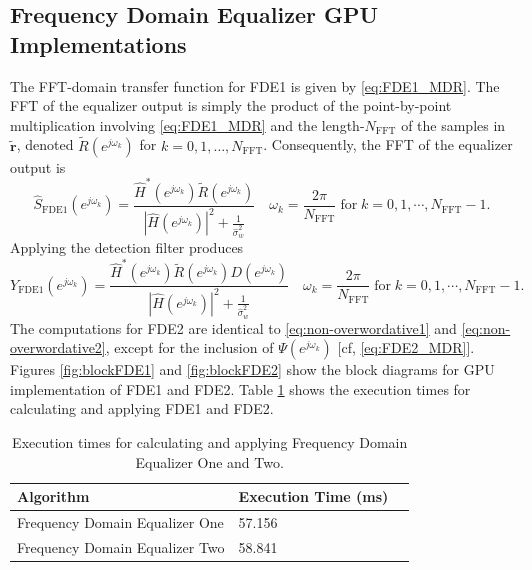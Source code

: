 \subsection{Frequency Domain Equalizer GPU Implementations}
The FFT-domain transfer function for FDE1 is given by \eqref{eq:FDE1_MDR}.
The FFT of the equalizer output is simply the product of the point-by-point multiplication involving
\eqref{eq:FDE1_MDR} and the length-$N_\text{FFT}$ of the samples in $\tilde{\mathbf{r}}$, denoted
$\tilde{R}(e^{j\omega_k})$ for $k=0,1,\ldots,N_\text{FFT}$. 
Consequently, the FFT of the equalizer output is
\begin{equation}
\hat{S}_\text{FDE1}(e^{j\omega_k}) = \frac{\hat{H}^\ast(e^{j\omega_k}) \tilde{R}(e^{j\omega_k})}
  {|\hat{H}(e^{j\omega_k})|^2  +  \frac{1}{\hat{\sigma}^2_w}} \quad
\omega_k = \frac{2\pi}{N_\text{FFT}} \;
\text{for} \;
k=0,1,\cdots,N_\text{FFT}-1.
\label{eq:non-overwordative1}
\end{equation}
Applying the detection filter produces
\begin{equation}
Y_\text{FDE1}(e^{j\omega_k}) = \frac{\hat{H}^\ast(e^{j\omega_k}) \tilde{R}(e^{j\omega_k}) D(e^{j\omega_k})}
  {|\hat{H}(e^{j\omega_k})|^2  +  \frac{1}{\hat{\sigma}^2_w}} \quad
\omega_k = \frac{2\pi}{N_\text{FFT}} \;
\text{for} \;
k=0,1,\cdots,N_\text{FFT}-1.
\label{eq:non-overwordative2}
\end{equation}
The computations for FDE2 are identical to \eqref{eq:non-overwordative1} and \eqref{eq:non-overwordative2},
except for the inclusion of $\Psi(e^{j\omega_k})$ [cf, \eqref{eq:FDE2_MDR}].
Figures \ref{fig:blockFDE1} and \ref{fig:blockFDE2} show the block diagrams for GPU implementation of FDE1 and FDE2.
Table \ref{tab:FDEtimingComparison} shows the execution times for calculating and applying FDE1 and FDE2.
\begin{table}
\caption{Execution times for calculating and applying Frequency Domain Equalizer One and Two.}
\begin{center}
\begin{tabular}{lll}
	\toprule
	Algorithm						& Execution Time (ms)	\\ \midrule
	Frequency Domain Equalizer One 	& 57.156				\\
	Frequency Domain Equalizer Two	& 58.841				\\
	\bottomrule
\end{tabular}
\end{center}
\label{tab:FDEtimingComparison}
\end{table}
